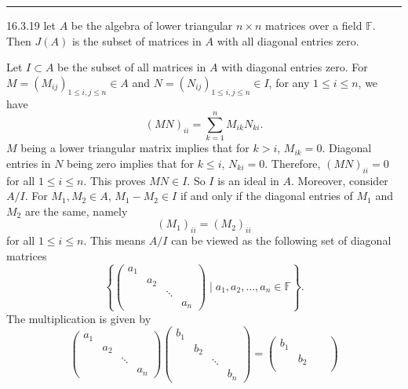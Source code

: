 \documentclass[a4paper, 12pt]{article}
\begin{document}
\noindent\rule{7in}{2.8pt}
\begin{problem}{16.3.19}
let \(A\) be the algebra of lower triangular \(n\times n\) matrices over a field \(\mathbb{F}\). Then \(J(A)\) is the subset of matrices in \(A\) with all diagonal 
entries zero.
\end{problem}
\begin{solution}
Let \(I\subset A\) be the subset of all matrices in \(A\) with  diagonal entries zero. For \(M=(M_{ij})_{1\leq i,j\leq n}\in A\) and \(N=(N_{ij})_{1\leq i,j\leq n}\in I\), for any \(1\leq i\leq n\), we have 
\[(MN)_{ii}=\sum_{k=1}^{n}M_{ik}N_{ki}.\]
\(M\) being a lower triangular matrix implies that for \(k> i\), \(M_{ik}=0\). Diagonal entries in \(N\) being zero implies that for \(k\leq i\), \(N_{ki}=0\). Therefore, \((MN)_{ii}=0\) for all \(1\leq i\leq n\). This proves \(MN\in I\). So 
\(I\) is an ideal in \(A\). Moreover, consider \(A/I\). For \(M_1,M_2\in A\), \(M_1-M_2\in I\) if and only if the diagonal entries of \(M_1\) and \(M_2\) are the same, namely 
\[(M_1)_{ii}=(M_2)_{ii}\]
for all \(1\leq i\leq n\). This means \(A/I\) can be viewed as the following set of diagonal matrices
\[\left\{ \begin{pmatrix}
    a_1& & &  \\ 
    &a_2& &  \\ 
    & & \ddots &  \\ 
    & & & a_n
\end{pmatrix}\mid a_1,a_2,\ldots,a_n\in \mathbb{F}\right\}.\]
The multiplication is given by 
\[\begin{pmatrix}
    a_1& & &  \\ 
    &a_2& &  \\ 
    & & \ddots &  \\ 
    & & & a_n
\end{pmatrix}\begin{pmatrix}
    b_1& & &  \\ 
    &b_2& &  \\ 
    & & \ddots &  \\ 
    & & & b_n
\end{pmatrix}=\begin{pmatrix}
    b_1& & &  \\ 
    &b_2& &  \\ 

\end{pmatrix}\]
\end{solution}
\end{document}

